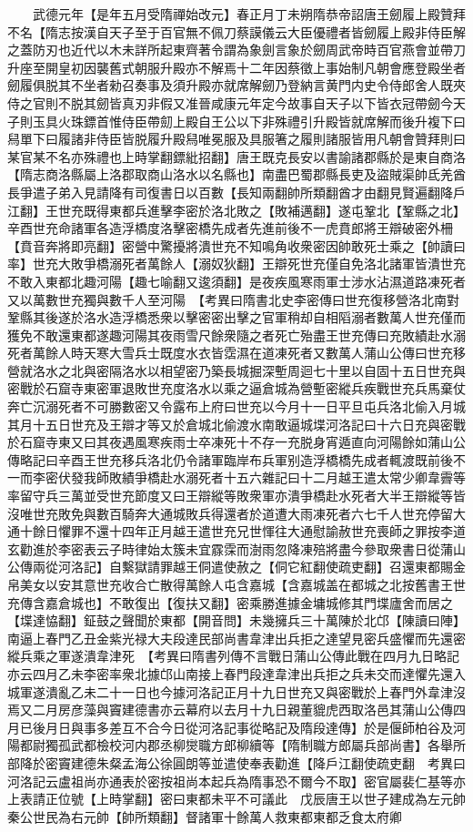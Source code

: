 　　武德元年【是年五月受隋禪始改元】春正月丁未朔隋恭帝詔唐王劒履上殿贊拜不名【隋志按漢自天子至于百官無不佩刀蔡謨儀云大臣優禮者皆劒履上殿非侍臣解之蓋防刃也近代以木未詳所起東齊著令謂為象劍言象於劒周武帝時百官燕會並帶刀升座至開皇初因襲舊式朝服升殿亦不解焉十二年因蔡徵上事始制凡朝會應登殿坐者劒履俱脱其不坐者勑召奏事及須升殿亦就席解劒乃登納言黄門内史令侍郎舍人既夾侍之官則不脱其劒皆真刃非假又准晉咸康元年定今故事自天子以下皆衣冠帶劒今天子則玉具火珠鏢首惟侍臣帶劎上殿自王公以下非殊禮引升殿皆就席解而後升複下曰舄單下曰履諸非侍臣皆脱履升殿舄唯冕服及具服箸之履則諸服皆用凡朝會贊拜則曰某官某不名亦殊禮也上時掌翻鏢紕招翻】唐王既克長安以書諭諸郡縣於是東自商洛【隋志商洛縣屬上洛郡取商山洛水以名縣也】南盡巴蜀郡縣長吏及盜賊渠帥氐羌酋長爭遣子弟入見請降有司復書日以百數【長知兩翻帥所類翻酋才由翻見賢遍翻降戶江翻】王世充既得東都兵進擊李密於洛北敗之【敗補邁翻】遂屯鞏北【鞏縣之北】辛酉世充命諸軍各造浮橋度洛擊密橋先成者先進前後不一虎賁郎將王辯破密外柵【賁音奔將即亮翻】密營中驚擾將潰世充不知鳴角收衆密因帥敢死士乘之【帥讀曰率】世充大敗爭橋溺死者萬餘人【溺奴狄翻】王辯死世充僅自免洛北諸軍皆潰世充不敢入東都北趣河陽【趣七喻翻又逡須翻】是夜疾風寒雨軍士涉水沾濕道路凍死者又以萬數世充獨與數千人至河陽　【考異曰隋書北史李密傳曰世充復移營洛北南對鞏縣其後遂於洛水造浮橋悉衆以擊密密出擊之官軍稍却自相䧟溺者數萬人世充僅而獲免不敢還東都遂趣河陽其夜雨雪尺餘衆隨之者死亡殆盡王世充傳曰充敗績赴水溺死者萬餘人時天寒大雪兵士既度水衣皆霑濕在道凍死者又數萬人蒲山公傳曰世充移營就洛水之北與密隔洛水以相望密乃築長城掘深塹周迴七十里以自固十五日世充與密戰於石窟寺東密軍退敗世充度洛水以乘之逼倉城為營塹密縱兵疾戰世充兵馬棄仗奔亡沉溺死者不可勝數密又令露布上府曰世充以今月十一日平旦屯兵洛北偷入月城其月十五日世充及王辯才等又於倉城北偷渡水南敢逼城堞河洛記曰十六日充與密戰於石窟寺東又曰其夜遇風寒疾雨士卒凍死十不存一充脱身宵遁直向河陽餘如蒲山公傳略記曰辛酉王世充移兵洛北仍令諸軍臨岸布兵軍别造浮橋橋先成者輒渡既前後不一而李密伏發我師敗績爭橋赴水溺死者十五六雜記曰十二月越王遣太常少卿韋霽等率留守兵三萬並受世充節度又曰王辯縱等敗衆軍亦潰爭橋赴水死者大半王辯縱等皆沒唯世充敗免與數百騎奔大通城敗兵得還者於道遭大雨凍死者六七千人世充停留大通十餘日懼罪不還十四年正月越王遣世充兄世惲往大通慰諭赦世充喪師之罪按李道玄勸進於李密表云子時律始太簇未宜霡霂而澍雨忽降凍殕將盡今參取衆書日從蒲山公傳兩從河洛記】自繫獄請罪越王侗遣使赦之【侗它紅翻使疏吏翻】召還東都賜金帛美女以安其意世充收合亡散得萬餘人屯含嘉城【含嘉城盖在都城之北按舊書王世充傳含嘉倉城也】不敢復出【復扶又翻】密乘勝進據金墉城修其門堞廬舍而居之【堞達恊翻】鉦鼓之聲聞於東都【開音問】未幾擁兵三十萬陳於北邙【陳讀曰陣】南逼上春門乙丑金紫光禄大夫段達民部尚書韋津出兵拒之達望見密兵盛懼而先還密縱兵乘之軍遂潰韋津死　【考異曰隋書列傳不言戰日蒲山公傳此戰在四月九日略記亦云四月乙未李密率衆北據邙山南接上春門段達韋津出兵拒之兵未交而達懼先還入城軍遂潰亂乙未二十一日也今據河洛記正月十九日世充又與密戰於上春門外韋津沒焉又二月房彦藻與竇建德書亦云幕府以去月十九日親董貔虎西取洛邑其蒲山公傳四月已後月日與事多差互不合今日從河洛記事從略記及隋段達傳】於是偃師柏谷及河陽都尉獨孤武都檢校河内郡丞柳爕職方郎柳續等【隋制職方郎屬兵部尚書】各舉所部降於密竇建德朱粲孟海公徐圓朗等並遣使奉表勸進【降戶江翻使疏吏翻　考異曰河洛記云盧祖尚亦通表於密按祖尚本起兵為隋事恐不爾今不取】密官屬裴仁基等亦上表請正位號【上時掌翻】密曰東都未平不可議此　戊辰唐王以世子建成為左元帥秦公世民為右元帥【帥所類翻】督諸軍十餘萬人救東都東都乏食太府卿